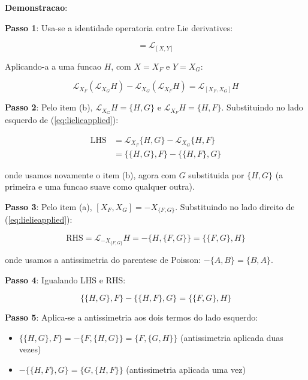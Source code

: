 \documentclass[5p]{elsarticle}
\begin{document}
\textbf{Demonstracao}:

\textbf{Passo 1}: Usa-se a identidade operatoria entre Lie derivatives:

\begin{equation}
[\mathcal{L}_X, \mathcal{L}_Y] = \mathcal{L}_{[X,Y]}
\label{eq:lielie}
\end{equation}

Aplicando-a a uma funcao $H$, com $X = X_F$ e $Y = X_G$:

\begin{equation}
\mathcal{L}_{X_F}(\mathcal{L}_{X_G}H) - \mathcal{L}_{X_G}(\mathcal{L}_{X_F}H)
= \mathcal{L}_{[X_F, X_G]}H
\label{eq:lielieapplied}
\end{equation}

\textbf{Passo 2}: Pelo item (b), $\mathcal{L}_{X_G}H = \{H, G\}$ e
$\mathcal{L}_{X_F}H = \{H, F\}$. Substituindo no lado esquerdo de
(\ref{eq:lielieapplied}):

\begin{align}
\text{LHS} &= \mathcal{L}_{X_F}\{H,G\} - \mathcal{L}_{X_G}\{H,F\} \nonumber\\
&= \{\{H,G\}, F\} - \{\{H,F\}, G\} \nonumber
\end{align}

onde usamos novamente o item (b), agora com $G$ substituida por
$\{H,G\}$ (a primeira e uma funcao suave como qualquer outra).

\textbf{Passo 3}: Pelo item (a), $[X_F, X_G] = -X_{\{F,G\}}$.
Substituindo no lado direito de (\ref{eq:lielieapplied}):

\begin{equation}
\text{RHS} = \mathcal{L}_{-X_{\{F,G\}}}H = -\{H, \{F,G\}\}
= \{\{F,G\}, H\}
\end{equation}

onde usamos a antissimetria do parentese de Poisson:
$-\{A,B\} = \{B,A\}$.

\textbf{Passo 4}: Igualando LHS e RHS:

\begin{equation}
\{\{H,G\}, F\} - \{\{H,F\}, G\} = \{\{F,G\}, H\}
\end{equation}

\textbf{Passo 5}: Aplica-se a antissimetria aos dois termos do lado
esquerdo:

\begin{itemize}
  \item $\{\{H,G\}, F\} = -\{F, \{H,G\}\} = \{F, \{G,H\}\}$
        (antissimetria aplicada duas vezes)
  \item $-\{\{H,F\}, G\} = \{G, \{H,F\}\}$
        (antissimetria aplicada uma vez)
\end{itemize}
\end{document}

